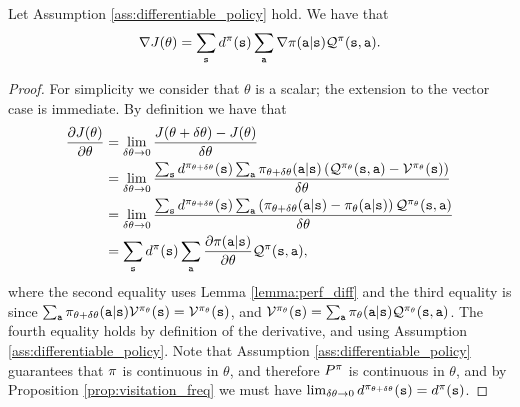 \begin{theorem}\label{thm:policy_gradient_direct}
    Let Assumption \ref{ass:differentiable_policy} hold. We have that
    \begin{equation*}
        \nabla J(\theta) = \sum_{{\tt s}} d^{\pi}({\tt s}) \sum_{\tt a} \nabla \pi({\tt a}|{\tt s})\mathcal{Q}^{\pi}({\tt s},{\tt a}).
    \end{equation*}
\end{theorem}
\begin{proof}
    For simplicity we consider that $\theta$ is a scalar; the extension to the vector case is immediate.
    By definition we have that
    \begin{equation*}
        \begin{split}
            \frac{\partial J(\theta)}{\partial \theta} &= \lim_{\delta \theta \to 0} \frac{J(\theta+ \delta \theta) - J(\theta)}{\delta \theta} \\
            &=\lim_{\delta \theta \to 0} \frac{\sum_{{\tt s}} d^{\pi_{\theta+ \delta \theta}}({\tt s}) \sum_{\tt a} \pi_{\theta+ \delta \theta}({\tt a}|{\tt s})\left( \mathcal{Q}^{\pi_{\theta}}({\tt s},{\tt a}) - \mathcal{V}^{\pi_{\theta}}({\tt s})\right)}{\delta \theta}\\
            &= \lim_{\delta \theta \to 0} \frac{\sum_{{\tt s}} d^{\pi_{\theta+ \delta \theta}}({\tt s}) \sum_{\tt a} \left(\pi_{\theta+ \delta \theta}({\tt a}|{\tt s}) - \pi_{\theta}({\tt a}|{\tt s})\right) \mathcal{Q}^{\pi_{\theta}}({\tt s},{\tt a})}{\delta \theta}\\
            &= \sum_{{\tt s}} d^{\pi}({\tt s}) \sum_{\tt a} \frac{\partial \pi({\tt a}|{\tt s})}{\partial \theta} \mathcal{Q}^{\pi}({\tt s},{\tt a}),
        \end{split}
    \end{equation*}
\sloppy where the second equality uses Lemma \ref{lemma:perf_diff} and the third equality is since $\sum_{\tt a} \pi_{\theta+ \delta \theta}({\tt a}|{\tt s})\mathcal{V}^{\pi_{\theta}}({\tt s}) = \mathcal{V}^{\pi_{\theta}}({\tt s})$, and $\mathcal{V}^{\pi_{\theta}}({\tt s}) = \sum_{{\tt a}} \pi_{\theta}({\tt a}|{\tt s}) \mathcal{Q}^{\pi_{\theta}}({\tt s},{\tt a})$. The fourth equality holds by definition of the derivative, and using Assumption \ref{ass:differentiable_policy}. Note that Assumption \ref{ass:differentiable_policy} guarantees that $\pi$ is continuous in $\theta$, and therefore $P^{\pi}$ is continuous in $\theta$, and by Proposition \ref{prop:visitation_freq} we must have $\lim_{\delta \theta \to 0} d^{\pi_{\theta+ \delta \theta}}({\tt s}) = d^{\pi}({\tt s})$.
\end{proof}

